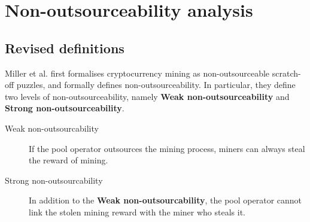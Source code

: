 \section{Non-outsourceability analysis}
\label{sec:non_outsourceability}



\subsection{Revised definitions}

Miller et al. \cite{miller2015nonoutsourceable} first formalises cryptocurrency mining as non-outsourceable scratch-off puzzles, and formally defines non-outsourceability.
In particular, they define two levels of non-outsourceability, namely \textbf{Weak non-outsourceability} and \textbf{Strong non-outsourceability}.

\begin{description}
    \item[Weak non-outsourcability] If the pool operator outsources the mining process, miners can always steal the reward of mining.
    \item[Strong non-outsourcability] In addition to the \textbf{Weak non-outsourcability}, the pool operator cannot link the stolen mining reward with the miner who steals it.
\end{description}

